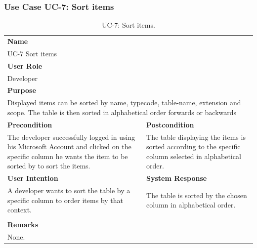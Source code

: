 
\subsubsection{Use Case UC-7: Sort items}\label{subsubsec:use-case-uc-7:-sort-items}

\begin{table}[H]
    \centering
    \begin{tabular}{|p{}|p{}|}

        \hline
        \multicolumn{2}{|l|}{\rowcolor{gray!50}\textbf{Name}} \\
        \multicolumn{2}{|l|}{UC-7 Sort items} \\ \hline

        \multicolumn{2}{|l|}{\rowcolor{gray!50}\textbf{User Role}} \\
        \multicolumn{2}{|l|}{Developer} \\ \hline

        \multicolumn{2}{|l|}{\rowcolor{gray!50}\textbf{Purpose}} \\
        \multicolumn{2}{|p{1\textwidth}|}{Displayed items can be sorted by name, typecode, table-name, extension and scope. The table is then sorted in alphabetical order forwards or backwards} \\ \hline

        \rowcolor{gray!50}\textbf{Precondition} & \rowcolor{gray!50}\textbf{Postcondition} \\
        The developer successfully logged in using his Microsoft Account and clicked on the specific column he wants the item to be sorted by  to sort the items.
        &
        The table displaying the items is sorted according to the specific column selected in alphabetical order.\\ \hline

        \rowcolor{gray!50}\textbf{User Intention} & \rowcolor{gray!50}\textbf{System Response} \\
        A developer wants to sort the table by a specific column to order items by that context.
        &
        The table is sorted by the chosen column in alphabetical order. \\ \hline

        & \\ \hline

        \multicolumn{2}{|l|}{\rowcolor{gray!50}\textbf{Remarks}} \\
        \multicolumn{2}{|p{1\textwidth}|}{None.} \\ \hline
    \end{tabular}
    \caption{UC-7: Sort items.}
    \label{tab:uc-sort-items}
\end{table}

